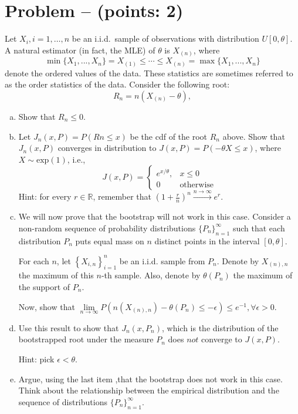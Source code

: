 \documentclass[11pt]{article}
\theoremstyle{definition}
\newcounter{problem}
\renewcommand{\theproblem}{\arabic{problem}}
\newcommand{\problem}[1]{
	\stepcounter{problem}
	\section*{Problem \theproblem{} -- (points: #1)}
}
\begin{document}
\problem{2}
Let $X_i, i = 1, \dots, n$ be an i.i.d.\ sample of observations with distribution $U[0, \theta]$. A natural estimator (in fact, the MLE) of $\theta$ is $X_{(n)}$, where
\[
\min\{X_1, ..., X_n\} =  X_{(1)} \leq \cdots \leq X_{(n)} = \max\{X_1, ..., X_n\}
\]
denote the ordered values of the data. These statistics are sometimes referred to as the order statistics of the data. Consider the following root:
\[
R_n = n(X_{(n)} - \theta),
\]

\begin{enumerate}[a)]
	\item Show that $R_n \leq 0$.
    \item Let $J_n(x, P) = P(Rn \leq x)$ be the cdf of the root $R_n$ above. Show that $J_n(x, P)$ converges in distribution to $J(x, P) = P(-\theta X \leq x)$, where $X \sim \text{exp}(1)$, i.e.,
    \[
    J(x, P) =
    \begin{cases}
    e^{x/\theta}, & x \leq 0 \\
    0 & \text{otherwise}
    \end{cases}
    \]
	Hint: for every $r \in \mathbb{R}$, remember that $\left(1 + \frac{r}{n}\right)^{n} \xrightarrow{n \to \infty} e^r$.

	\item We will now prove that the bootstrap will not work in this case. Consider a non-random sequence of probability distributions $\{P_n\}_{n=1}^{\infty}$ such that each distribution $P_n$ puts equal mass on $n$ distinct points in the interval $[0, \theta]$.
	
	For each $n$, let $\left\{X_{i, n}\right\}_{i=1}^{n}$ be an i.i.d. sample from $P_n$. Denote by $X_{(n), n}$ the maximum of this $n$-th sample. Also, denote by $\theta(P_n)$ the maximum of the support of $P_n$.
	
	Now, show that $\lim\limits_{n\rightarrow \infty}P\left(n (X_{(n), n}) - \theta(P_n) \leq - \epsilon\right) \leq e^{-1}, \forall \epsilon >0$.

	\item Use this result to show that $J_n(x, P_n)$, which is the distribution of the bootstrapped root under the measure $P_n$ does $not$ converge to $J(x, P)$.
	
	Hint: pick $\epsilon < \theta$.

	\item Argue, using the last item ,that the bootstrap does not work in this case. Think about the relationship between the empirical distribution and the sequence of distributions $\{P_n\}_{n=1}^{\infty}$.
\end{enumerate}
\end{document}

